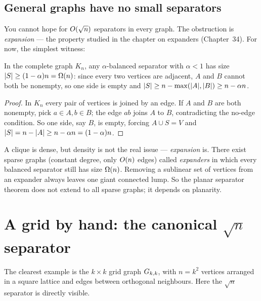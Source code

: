 \subsection{General graphs have no small separators}

You cannot hope for $O(\sqrt n)$ separators in every graph. The obstruction is \emph{expansion} --- the property studied in the chapter on expanders (Chapter~34). For now, the simplest witness:

\begin{proposition}\label{ch27:prop-clique}
In the complete graph $K_n$, any $\alpha$-balanced separator with $\alpha<1$ has size $\lvert S\rvert\ge (1-\alpha)n=\Omega(n)$: since every two vertices are adjacent, $A$ and $B$ cannot both be nonempty, so one side is empty and $\lvert S\rvert \ge n - \max(\lvert A\rvert,\lvert B\rvert)\ge n-\alpha n$.
\end{proposition}

\begin{proof}
In $K_n$ every pair of vertices is joined by an edge. If $A$ and $B$ are both nonempty, pick $a\in A,b\in B$; the edge $ab$ joins $A$ to $B$, contradicting the no-edge condition. So one side, say $B$, is empty, forcing $A\cup S=V$ and $\lvert S\rvert = n-\lvert A\rvert\ge n-\alpha n=(1-\alpha)n$.
\end{proof}

A clique is dense, but density is not the real issue --- \emph{expansion} is. There exist sparse graphs (constant degree, only $O(n)$ edges) called \emph{expanders} in which every balanced separator still has size $\Omega(n)$. Removing a sublinear set of vertices from an expander always leaves one giant connected lump. So the planar separator theorem does not extend to all sparse graphs; it depends on planarity.

\section{A grid by hand: the canonical $\sqrt n$ separator}

The clearest example is the $k\times k$ grid graph $G_{k,k}$, with $n=k^2$ vertices arranged in a square lattice and edges between orthogonal neighbours. Here the $\sqrt n$ separator is directly visible.


